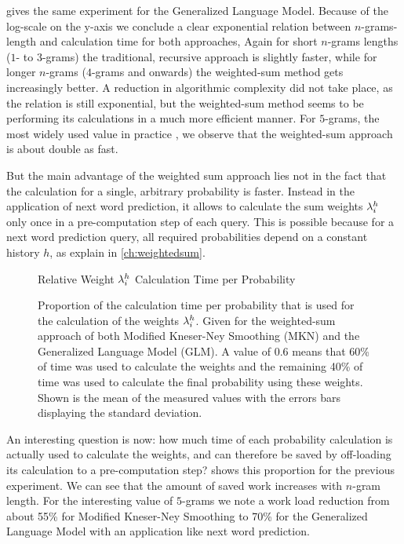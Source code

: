  gives the same experiment for the Generalized
Language Model.
Because of the log-scale on the y-axis we conclude a clear exponential relation
between $n$-grams-length and calculation time for both approaches,
Again for short $n$-grams lengths ($1$- to $3$-grams) the traditional, recursive
approach is slightly faster, while for longer $n$-grams ($4$-grams and onwards)
the weighted-sum method gets increasingly better.
A reduction in algorithmic complexity did not take place, as the relation is
still exponential, but the weighted-sum method seems to be performing its
calculations in a much more efficient manner.
For $5$-grams, the most widely used value in practice
\parencite{JurafskyMartin2009,Goodman2001,Stolcke2000}, we observe that the
weighted-sum approach is about double as fast.

But the main advantage of the weighted sum approach lies not in the fact
that the calculation for a single, arbitrary probability is faster.
Instead in the application of next word prediction, it allows to calculate the
sum weights $\lambda^h_i$ only once in a pre-computation step of each query.
This is possible because for a next word prediction query, all required
probabilities depend on a constant history $h$, as explain in
\cref{ch:weightedsum}.

\begin{figure}
  \centering
  Relative Weight $\lambda^h_i$ Calculation Time per Probability
  \\[1.5ex]
  \begin{minipage}{0.7\textwidth}
    \centering
    
  \end{minipage}
  \caption{Proportion of the calculation time per probability that is used
    for the calculation of the weights $\lambda^h_i$.
    Given for the weighted-sum approach of both Modified Kneser-Ney Smoothing
    (MKN) and the Generalized Language Model (GLM).
    A value of \num{0.6} means that 60\% of time
    was used to calculate the weights and the remaining 40\% of time was used
    to calculate the final probability using these weights.
    Shown is the mean of the measured values with the errors bars displaying the
    standard deviation.}
  \label{fig:evaluation-weight-times}
\end{figure}

An interesting question is now: how much time of each probability calculation
is actually used to calculate the weights, and can therefore be saved by
off-loading its calculation to a pre-computation step?
 shows this proportion for the previous
experiment.
We can see that the amount of saved work increases with $n$-gram length.
For the interesting value of $5$-grams we note a work load reduction from
about 55\% for Modified Kneser-Ney Smoothing to 70\% for the Generalized
Language Model with an application like next word prediction.

